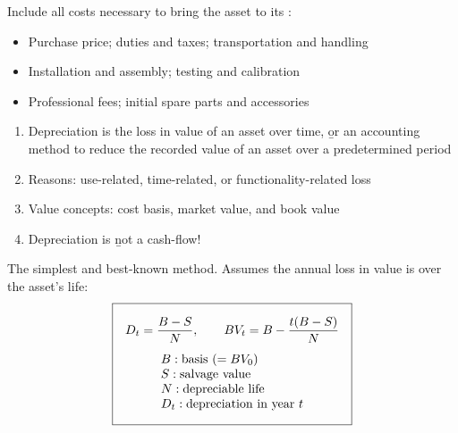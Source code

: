 Include all costs necessary to bring the asset to its :
\begin{itemize}
    \item Purchase price; duties and taxes; transportation and handling
    \item Installation and assembly; testing and calibration
    \item Professional fees; initial spare parts and accessories
\end{itemize}

\begin{enumerate}
    \item Depreciation is the loss in value of an asset over time, \b{or} an accounting method to reduce the recorded value of an asset over a predetermined period
    \item Reasons: use-related, time-related, or functionality-related loss
    \item Value concepts: cost basis, market value, and book value
    \item Depreciation is \b{not} a cash-flow!
\end{enumerate}


\begin{definition}
    The simplest and best-known method. Assumes the annual loss in value is
     over the asset's life:
    \[\boxed{\begin{gathered}
        D_t = \frac{B - S}{N}, \qquad BV_t = B - \frac{t(B - S)}{N}\\[4pt]
        \begin{array}{@{}l@{}}
            B: \text{basis } (= BV_0)\\
            S: \text{salvage value}\\
            N: \text{depreciable life}\\
            D_t: \text{depreciation in year } t
        \end{array}
    \end{gathered}}\]
\end{definition}


